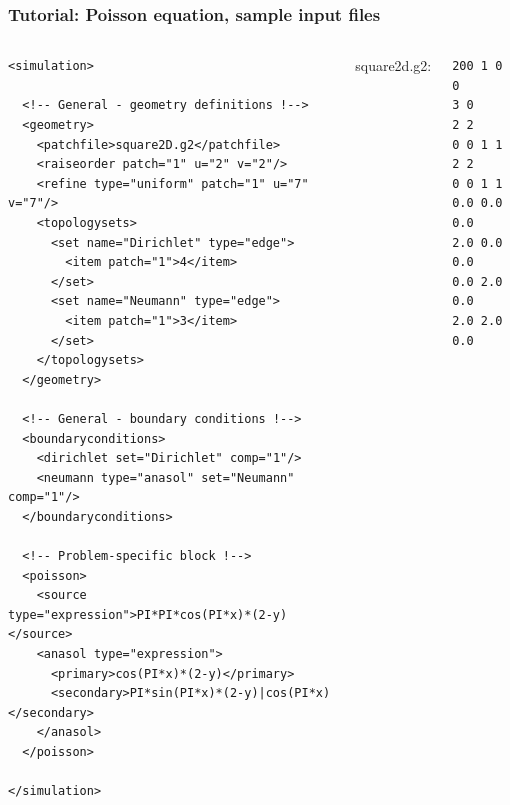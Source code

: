 \documentclass{beamer}
\begin{document}
\begin{frame}[fragile] %
 \frametitle{Tutorial: Poisson equation, sample input files}

 \begin{columns}[c]
  \tiny\begin{verbatim}
<simulation>

  <!-- General - geometry definitions !-->
  <geometry>
    <patchfile>square2D.g2</patchfile>
    <raiseorder patch="1" u="2" v="2"/>
    <refine type="uniform" patch="1" u="7" v="7"/>
    <topologysets>
      <set name="Dirichlet" type="edge">
        <item patch="1">4</item>
      </set>
      <set name="Neumann" type="edge">
        <item patch="1">3</item>
      </set>
    </topologysets>
  </geometry>

  <!-- General - boundary conditions !-->
  <boundaryconditions>
    <dirichlet set="Dirichlet" comp="1"/>
    <neumann type="anasol" set="Neumann" comp="1"/>
  </boundaryconditions>

  <!-- Problem-specific block !-->
  <poisson>
    <source type="expression">PI*PI*cos(PI*x)*(2-y)</source>
    <anasol type="expression">
      <primary>cos(PI*x)*(2-y)</primary>
      <secondary>PI*sin(PI*x)*(2-y)|cos(PI*x)</secondary>
    </anasol>
  </poisson>

</simulation>
  \end{verbatim}
  \tiny square2d.g2:
  \begin{verbatim}
200 1 0 0
3 0
2 2
0 0 1 1
2 2
0 0 1 1
0.0 0.0 0.0
2.0 0.0 0.0
0.0 2.0 0.0
2.0 2.0 0.0
  \end{verbatim}
 \end{columns}
\end{frame}
\end{document}

